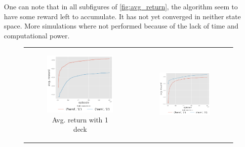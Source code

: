 One can note that in all subfigures of \ref{fig:avg_return}, the algorithm seem to have some reward left to accumulate. It has not yet converged in neither state space. More simulations where not performed because of the lack of time and computational power. 

\begin{figure}[htp]
\begin{tabular}{cc}
\centering
 \begin{subfigure}[b]{0.48\textwidth}
  	 \includegraphics[width=\textwidth]{./figures/avgReturnEp_ndeck1.png}
   \caption{Avg. return with 1 deck\label{sfig:nd1}}
 \end{subfigure}
 &
 \begin{subfigure}[b]{0.48\textwidth}
  	 \includegraphics[width=\textwidth]{./figures/avgReturnEp_ndeck2.png}

\end{subfigure}
\end{tabular}
\end{figure}
